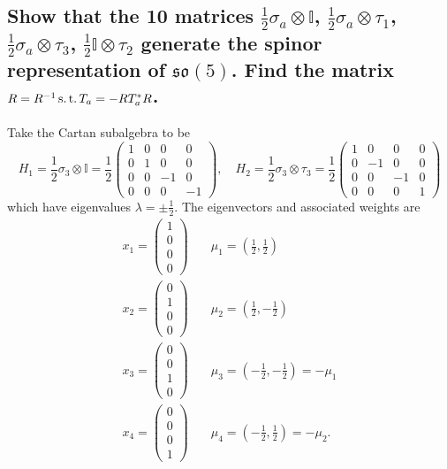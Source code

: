 \documentclass[main.tex]{subfiles}
\begin{document}
\subsection{Show that the 10 matrices $\frac{1}{2}\sigma_a\otimes\mathbb{I}$, $\frac{1}{2}\sigma_a\otimes\tau_1$, $\frac{1}{2}\sigma_a\otimes\tau_3$, $\frac{1}{2}\mathbb{I}\otimes\tau_2$ generate the spinor representation of $\mathfrak{so}(5)$. Find the matrix $R=R^{-1}\operatorname{s.t.} T_a=-RT_a^*R$.}

Take the Cartan subalgebra to be
\begin{equation}
H_1=\frac{1}{2}\sigma_3\otimes\mathbb{I}=\frac{1}{2}\begin{pmatrix}1&0&0&0\\
0&1&0&0\\0&0&-1&0\\0&0&0&-1\end{pmatrix},\quad H_2=\frac{1}{2}\sigma_3\otimes\tau_3=\frac{1}{2}\begin{pmatrix}1&0&0&0\\
0&-1&0&0\\0&0&-1&0\\0&0&0&1\end{pmatrix}
\end{equation}  
which have eigenvalues $\lambda=\pm\frac{1}{2}$. The eigenvectors and associated weights are
\begin{align}
x_1=\begin{pmatrix}1\\0\\0\\0\end{pmatrix}&\quad \mu_1=(\frac{1}{2},\frac{1}{2})\\
x_2=\begin{pmatrix}0\\1\\0\\0\end{pmatrix}&\quad \mu_2=(\frac{1}{2},-\frac{1}{2})\\
x_3=\begin{pmatrix}0\\0\\1\\0\end{pmatrix}&\quad \mu_3=(-\frac{1}{2},-\frac{1}{2})=-\mu_1\\
x_4=\begin{pmatrix}0\\0\\0\\1\end{pmatrix}&\quad \mu_4=(-\frac{1}{2},\frac{1}{2})=-\mu_2.
\end{align}
\end{document}
